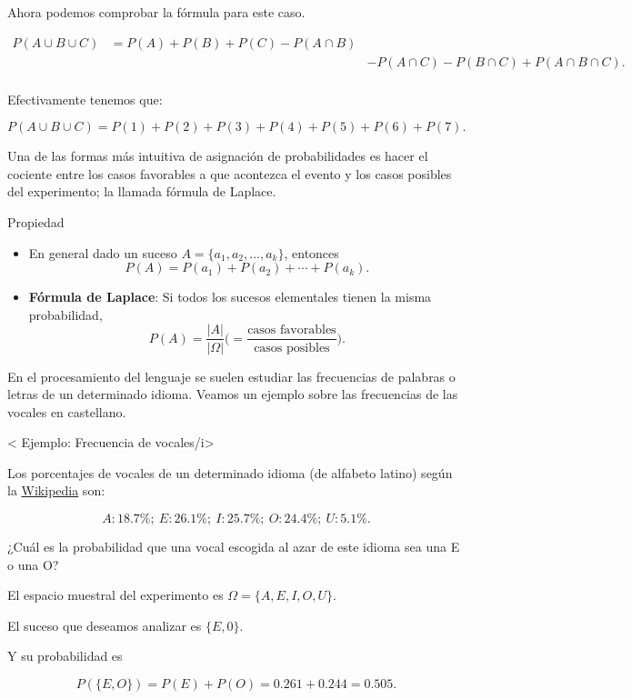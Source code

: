 \documentclass[
  letterpaper,
  DIV=11,
  numbers=noendperiod]{scrreprt}
\begin{document}
Ahora podemos comprobar la fórmula para este caso.

\[
\begin{aligned}
P(A\cup B\cup C)&=P(A)+P(B)+P(C)-P(A\cap B) \\
  & & - P(A\cap C)-P(B\cap C)+P(A\cap B\cap C).\\
\end{aligned}
\]

Efectivamente tenemos que:

\[P(A\cup B\cup C)=P(1)+P(2)+P(3)+P(4)+P(5)+P(6)+P(7).\]

Una de las formas más intuitiva de asignación de probabilidades es hacer
el cociente entre los casos favorables a que acontezca el evento y los
casos posibles del experimento; la llamada fórmula de Laplace.

\begin{Proposicion}{Propiedad}{}

\begin{itemize}
\item
  En general dado un suceso \(A=\{a_1,a_2,\ldots,a_k\}\), entonces \[
  P(A)=P(a_1)+P(a_2)+\cdots+P(a_k).
  \]
\item
  \textbf{Fórmula de Laplace}: Si todos los sucesos elementales tienen
  la misma probabilidad, \[
  P(A)=\frac{|A|}{|\Omega|}\Big(=\frac{\mbox{casos favorables}}{\mbox{casos posibles}}\Big).
  \]
\end{itemize}

\end{Proposicion}

En el procesamiento del lenguaje se suelen estudiar las frecuencias de
palabras o letras de un determinado idioma. Veamos un ejemplo sobre las
frecuencias de las vocales en castellano.

\begin{Ejemplo}{< Ejemplo: Frecuencia de vocales/i>}{}

Los porcentajes de vocales de un determinado idioma (de alfabeto latino)
según la
\href{https://es.wikipedia.org/wiki/Frecuencia_de_aparici\%C3\%B3n_de_letras}{Wikipedia}
son:

\[A: 18.7\%;\ E: 26.1\%;\ I: 25.7\%;\ O: 24.4\%;\ U: 5.1\%.\]

¿Cuál es la probabilidad que una vocal escogida al azar de este idioma
sea una E o una O?

El espacio muestral del experimento es \(\Omega=\{A,E,I,O,U\}\).

El suceso que deseamos analizar es \(\{E,0\}\).

Y su probabilidad es

\[P(\{E,O\})=P(E)+P(O)=0.261+0.244=0.505.\]

\end{Ejemplo}
\end{document}
